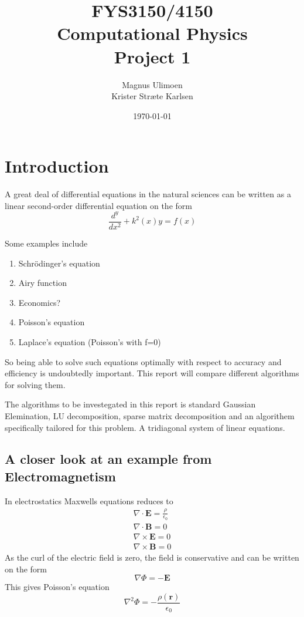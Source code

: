 \documentclass[11pt,a4paper,english,final]{article}
\title{FYS3150/4150\\Computational Physics\\Project 1}
\author{Magnus Ulimoen\\Krister Stræte Karlsen}
\date{\today}
\numberwithin{equation}{section}
\newcommand{\ve}[1]{\mathbf{#1}} %
\begin{document}
\maketitle

\section{Introduction}

A great deal of differential equations in the natural sciences can be written 
as a linear second-order differential equation on the form
\begin{equation}
\frac{d^y}{dx^2} + k^2(x)y = f(x)
\label{eq:2orderDIFF}
\end{equation}


Some examples include
\begin{enumerate}[label=\bfseries \Roman*]
\item Schrödinger's equation
\item Airy function
\item Economics?
\item Poisson's equation
\item Laplace's equation (Poisson's with f=0)
\end{enumerate}

So being able to solve such equations optimally with respect to accuracy 
and efficiency is undoubtedly important. This report will compare 
different algorithms for solving them.

The algorithms to be investegated in this report is standard Gaussian Elemination, LU decomposition, sparse matrix decomposition and an algorithem specifically tailored for this problem. A tridiagonal system of linear equations. 


\subsection{A closer look at an example from Electromagnetism}

In electrostatics Maxwells equations reduces to
\begin{gather}
\nabla \cdot \ve{E} = \frac{\rho}{\epsilon_0}\\
\nabla \cdot \ve{B} = 0\\
\nabla \times \ve{E} = 0\\
\nabla \times \ve{B} = 0
\end{gather}
As the curl of the electric field is zero, the field is conservative
and can be written on the form
\begin{equation}
\nabla \Phi = -\ve{E}
\end{equation}
This gives Poisson's equation
\begin{equation}
\nabla^2\Phi = -\frac{\rho(\ve{r})}{\epsilon_0}
\end{equation}
\end{document}
